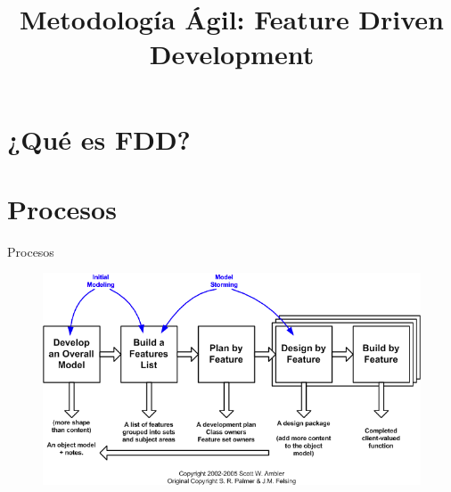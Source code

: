 \documentclass[12pt]{beamer}
\title{Metodología Ágil: Feature Driven Development}
\author[Author One at al.]{\makebox[0pt]{Miguel \and Sofía \and Pedro \and Victoria \and Lidia}}
\date{}
\begin{document}
\frame{}


\frame{\tableofcontents} %


\section{¿Qué es FDD?}

\section{Procesos}\label{proc}
\begin{frame}[fragile]{Procesos}
  \vspace{1cm}
  \begin{figure}[H]
    \centering
    \includegraphics[width=1\textwidth]{lifecycle}
\end{figure}
\end{frame}



\end{document}
